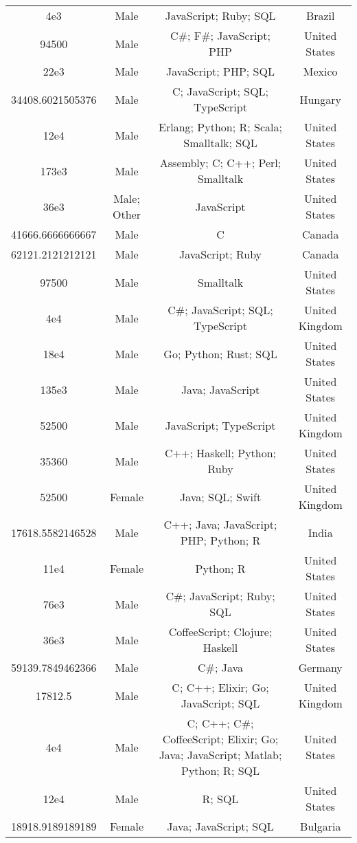 \begin{center}
\begin{tabular}{ |c|c|c|c| }
4e3  &  Male  &  JavaScript; Ruby; SQL  &  Brazil  \\ 
94500  &  Male  &  C\#; F\#; JavaScript; PHP  &  United States  \\ 
22e3  &  Male  &  JavaScript; PHP; SQL  &  Mexico  \\ 
34408.6021505376  &  Male  &  C; JavaScript; SQL; TypeScript  &  Hungary  \\ 
12e4  &  Male  &  Erlang; Python; R; Scala; Smalltalk; SQL  &  United States  \\ 
173e3  &  Male  &  Assembly; C; C++; Perl; Smalltalk  &  United States  \\ 
36e3  &  Male; Other  &  JavaScript  &  United States  \\ 
41666.6666666667  &  Male  &  C  &  Canada  \\ 
62121.2121212121  &  Male  &  JavaScript; Ruby  &  Canada  \\ 
97500  &  Male  &  Smalltalk  &  United States  \\ 
4e4  &  Male  &  C\#; JavaScript; SQL; TypeScript  &  United Kingdom  \\ 
18e4  &  Male  &  Go; Python; Rust; SQL  &  United States  \\ 
135e3  &  Male  &  Java; JavaScript  &  United States  \\ 
52500  &  Male  &  JavaScript; TypeScript  &  United Kingdom  \\ 
35360  &  Male  &  C++; Haskell; Python; Ruby  &  United States  \\ 
52500  &  Female  &  Java; SQL; Swift  &  United Kingdom  \\ 
17618.5582146528  &  Male  &  C++; Java; JavaScript; PHP; Python; R  &  India  \\ 
11e4  &  Female  &  Python; R  &  United States  \\ 
76e3  &  Male  &  C\#; JavaScript; Ruby; SQL  &  United States  \\ 
36e3  &  Male  &  CoffeeScript; Clojure; Haskell  &  United States  \\ 
59139.7849462366  &  Male  &  C\#; Java  &  Germany  \\ 
17812.5  &  Male  &  C; C++; Elixir; Go; JavaScript; SQL  &  United Kingdom  \\ 
4e4  &  Male  &  C; C++; C\#; CoffeeScript; Elixir; Go; Java; JavaScript; Matlab; Python; R; SQL  &  United States  \\ 
12e4  &  Male  &  R; SQL  &  United States  \\ 
18918.9189189189  &  Female  &  Java; JavaScript; SQL  &  Bulgaria  \\ 

\end{tabular}
\end{center}
